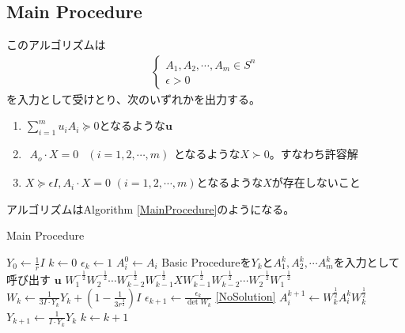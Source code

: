 \subsection{Main Procedure}
このアルゴリズムは
\begin{align*}
  \left\{
    \begin{array}{l}
      A_1, A_2, \cdots, A_m \in S^n \\
      \epsilon > 0
    \end{array}
  \right.
\end{align*}
を入力として受けとり、次のいずれかを出力する。
\begin{enumerate}[label=(\alph*)]
  \item $\displaystyle{\sum_{i = 1}^m u_i A_i \succeq 0}$となるような$\mathbf{u}$ \label{DualSolution}
  \item $\begin{array}{ll} A_o \cdot X = 0 & (i = 1, 2, \cdots, m) \end{array}$となるような$X \succ 0$。すなわち許容解 \label{FeasibleSolution}
  \item $X \succeq \epsilon I, A_i \cdot X = 0 \,\, (i = 1, 2, \cdots, m)$となるような$X$が存在しないこと \label{NoSolution}
\end{enumerate}

アルゴリズムはAlgorithm \ref{MainProcedure}のようになる。
\begin{algorithm}
  \caption{Main Procedure}
  \label{MainProcedure}
  \begin{algorithmic}[1]
    \State $\displaystyle{Y_0 \leftarrow \frac{1}{r} I}$
    \State $k \leftarrow 0$
    \State $\epsilon_k \leftarrow 1$
      \State $A_i^0 \leftarrow A_i$
    \EndFor
    \State Basic Procedureを$Y_k$と$A_1^k, A_2^k, \cdots A_m^k$を入力として呼び出す \label{CallBasicProcedure}
      \State \Return $\mathbf{u}$
      \State \Return $\displaystyle{W_1^{-\frac{1}{2}} W_2^{-\frac{1}{2}} \cdots W_{k - 2}^{-\frac{1}{2}} W_{k - 1}^{-\frac{1}{2}} X W_{k - 1}^{-\frac{1}{2}} W_{k - 2}^{-\frac{1}{2}} \cdots W_2^{-\frac{1}{2}} W_1^{-\frac{1}{2}}}$
    \EndIf
    \State $\displaystyle{W_k \leftarrow \frac{1}{3 I \cdot Y_k} Y_k + (1 - \frac{1}{3 r^\frac{3}{2}}) I}$
    \State $\displaystyle{\epsilon_{k + 1} \leftarrow \frac{\epsilon_k}{\det W_k}}$
      \State \Return \ref{NoSolution}
    \EndIf
      \State $\displaystyle{A_i^{k + 1} \leftarrow W_k^\frac{1}{2} A_i^k W_k^\frac{1}{2}}$
    \EndFor
    \State $\displaystyle{Y_{k + 1} \leftarrow \frac{1}{I \cdot Y_k} Y_k}$
    \State $k \leftarrow k + 1$
    \State {}
  \end{algorithmic}
\end{algorithm}
